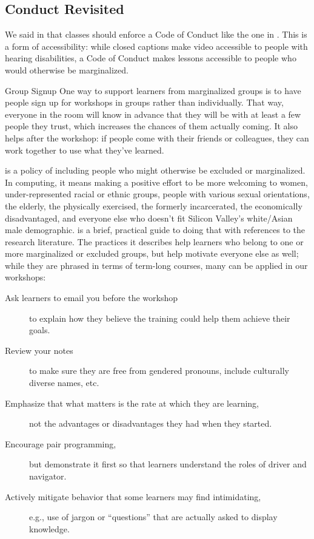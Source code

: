 \subsection*{Conduct Revisited}

We said in  that classes should
enforce a Code of Conduct like the one in . This
is a form of accessibility: while closed captions make video accessible
to people with hearing disabilities, a Code of Conduct makes lessons
accessible to people who would otherwise be marginalized.

\begin{aside}{Group Signup}
  One way to support learners from marginalized groups is to have people
  sign up for workshops in groups rather than individually. That way,
  everyone in the room will know in advance that they will be with at
  least a few people they trust, which increases the chances of them
  actually coming. It also helps after the workshop: if people come with
  their friends or colleagues, they can work together to use what
  they've learned.
\end{aside}


 is a policy of including people
who might otherwise be excluded or marginalized. In computing, it means
making a positive effort to be more welcoming to women,
under-represented racial or ethnic groups, people with various sexual
orientations, the elderly, the physically exercised, the formerly
incarcerated, the economically disadvantaged, and everyone else who
doesn't fit Silicon Valley's white/Asian male demographic.
\cite{Lee2017} is a brief, practical guide to doing that with
references to the research literature. The practices it describes help
learners who belong to one or more marginalized or excluded groups, but
help motivate everyone else as well; while they are phrased in terms of
term-long courses, many can be applied in our workshops:

\begin{description}
\item[Ask learners to email you before the workshop]
to explain how they believe the training could help them achieve
their goals.
\item[Review your notes]
to make sure they are free from gendered pronouns, include
culturally diverse names, etc.
\item[Emphasize that what matters is the rate at which they are learning,]
not the advantages or disadvantages they had when they started.
\item[Encourage pair programming,]
but demonstrate it first so that learners understand the roles
of driver and navigator.
\item[Actively mitigate behavior that some learners may find intimidating,]
e.g., use of jargon or ``questions'' that are actually asked to
display knowledge.
\end{description}

